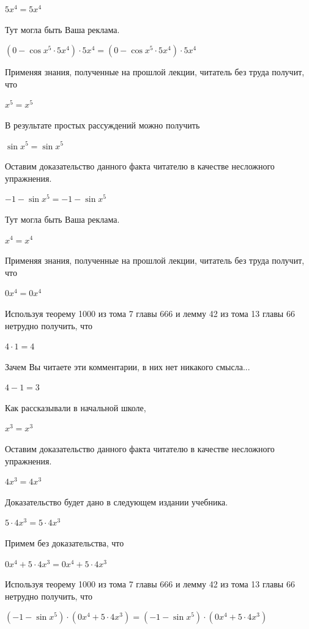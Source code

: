 \documentclass[12pt,a4paper,fleqn]{article}
\theoremstyle{definition}
\begin{document}
$ 5 { x }^{ 4 } =  5 { x }^{ 4 }$

Тут могла быть Ваша реклама. 

$( 0  - \cos{ x }^{ 5 } \cdot  5 { x }^{ 4 }) \cdot  5 { x }^{ 4 } = ( 0  - \cos{ x }^{ 5 } \cdot  5 { x }^{ 4 }) \cdot  5 { x }^{ 4 }$

Применяя знания, полученные на прошлой лекции, читатель без труда получит, что 

${ x }^{ 5 } = { x }^{ 5 }$

В результате простых рассуждений можно получить 

$\sin{ x }^{ 5 } = \sin{ x }^{ 5 }$

Оставим доказательство данного факта читателю в качестве несложного упражнения. 

$ -1  - \sin{ x }^{ 5 } =  -1  - \sin{ x }^{ 5 }$

Тут могла быть Ваша реклама. 

${ x }^{ 4 } = { x }^{ 4 }$

Применяя знания, полученные на прошлой лекции, читатель без труда получит, что 

$ 0 { x }^{ 4 } =  0 { x }^{ 4 }$

Используя теорему 1000 из тома 7 главы 666 и лемму 42 из тома 13 главы 66 нетрудно получить, что 

$ 4  \cdot  1  =  4 $

Зачем Вы читаете эти комментарии, в них нет никакого смысла... 

$ 4  -  1  =  3 $

Как рассказывали в начальной школе, 

${ x }^{ 3 } = { x }^{ 3 }$

Оставим доказательство данного факта читателю в качестве несложного упражнения. 

$ 4 { x }^{ 3 } =  4 { x }^{ 3 }$

Доказательство будет дано в следующем издании учебника. 

$ 5  \cdot  4 { x }^{ 3 } =  5  \cdot  4 { x }^{ 3 }$

Примем без доказательства, что 

$ 0 { x }^{ 4 } +  5  \cdot  4 { x }^{ 3 } =  0 { x }^{ 4 } +  5  \cdot  4 { x }^{ 3 }$

Используя теорему 1000 из тома 7 главы 666 и лемму 42 из тома 13 главы 66 нетрудно получить, что 

$( -1  - \sin{ x }^{ 5 }) \cdot ( 0 { x }^{ 4 } +  5  \cdot  4 { x }^{ 3 }) = ( -1  - \sin{ x }^{ 5 }) \cdot ( 0 { x }^{ 4 } +  5  \cdot  4 { x }^{ 3 })$
\end{document}
